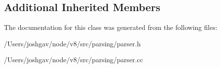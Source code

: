 \subsection*{Additional Inherited Members}


The documentation for this class was generated from the following files\+:\begin{DoxyCompactItemize}
\item 
/\+Users/joshgav/node/v8/src/parsing/parser.\+h\item 
/\+Users/joshgav/node/v8/src/parsing/parser.\+cc\end{DoxyCompactItemize}
